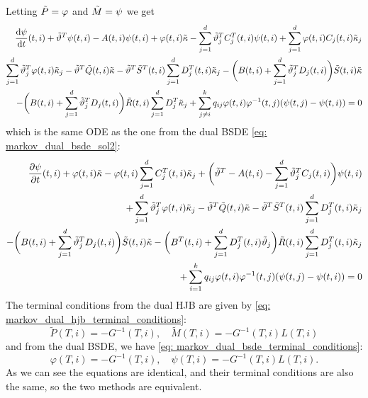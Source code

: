 Letting $\Tilde{P} = \varphi$ and $\Tilde{M} = \psi$ we get
\begin{align*}
    \frac{\mathop{}\!\mathrm{d} \psi}{\mathop{}\!\mathrm{d} t}(t,i) + \Tilde{\vartheta}^T \psi(t,i) - A(t,i) \psi(t,i) + \varphi(t,i) \Tilde{\kappa} - \sum_{j=1}^d \Tilde{\vartheta}_j^T C_j^T(t,i) \psi(t,i) + \sum_{j=1}^d \varphi(t,i) C_j(t,i) \Tilde{\kappa}_j\\
    \sum_{j=1}^d \Tilde{\vartheta}_j^T \varphi(t,i) \Tilde{\kappa}_j - \tilde{\vartheta}^T \Tilde{Q}(t,i) \Tilde{\kappa} - \Tilde{\vartheta}^T \Tilde{S}^T(t,i) \sum_{j=1}^d D_j^T(t,i) \Tilde{\kappa}_j - \bigg(B(t,i) + \sum_{j=1}^d \Tilde{\vartheta}_j^T D_j(t,i)\bigg)\Tilde{S}(t,i) \Tilde{\kappa}\\
    - \bigg( B(t,i) + \sum_{j=1}^d \Tilde{\vartheta}_j^T D_j(t,i) \bigg) \Tilde{R}(t,i) \sum_{j=1}^d D_j^T \Tilde{\kappa}_j +\sum_{j\ne i}^k q_{ij} \varphi(t,i) \varphi^{-1}(t,j) (\psi(t,j) - \psi(t,i)) = 0 
\end{align*}
which is the same ODE as the one from the dual BSDE \eqref{eq: markov_dual_bsde_sol2}: 
\begin{align*}
    \frac{\partial \psi}{\partial t}(t, i) + \varphi(t,i) \Tilde{\kappa} - \varphi(t,i) \sum_{j=1}^d C_j^T(t,i) \Tilde{\kappa}_j + \bigg( \Tilde{\vartheta}^T - A(t,i) - \sum_{j=1}^d \Tilde{\vartheta}^T_j C_j(t,i) \bigg) \psi(t,i)\\
    + \sum_{j=1}^d \Tilde{\vartheta}_j^T \varphi(t,i) \Tilde{\kappa}_j - \Tilde{\vartheta}^T \Tilde{Q}(t,i) \Tilde{\kappa} - \Tilde{\vartheta}^T \Tilde{S}^T(t,i) \sum_{j=1}^d D_j^T(t,i) \Tilde{\kappa}_j\\
    - \bigg( B(t,i) + \sum_{j=1}^d \Tilde{\vartheta}_j^T D_j(t,i) \bigg) \Tilde{S}(t,i) \Tilde{\kappa}
    - \bigg( B^T(t,i) + \sum_{j=1}^d D_j^T(t,i) \Tilde{\vartheta}_j\bigg) \Tilde{R}(t,i) \sum_{j=1}^d D_j^T(t,i) \Tilde{\kappa}_j\\
    + \sum_{i=1}^k q_{ij} \varphi(t,i) \varphi^{-1}(t,j) (\psi(t,j) - \psi(t,i)) = 0
\end{align*}
The terminal conditions from the dual HJB are given by \eqref{eq: markov_dual_hjb_terminal_conditions}:
\begin{equation*}
    \tilde{P}(T,i) = -G^{-1}(T,i), \quad  \tilde{M}(T,i) = - G^{-1}(T,i)L(T,i)
\end{equation*}
and from the dual BSDE, we have \eqref{eq: markov_dual_bsde_terminal_conditions}:
\begin{equation*}
    \varphi(T, i) = - G^{-1}(T, i), \quad \psi(T, i) = - G^{-1}(T,i) L(T, i). 
\end{equation*}
As we can see the equations are identical, and their terminal conditions are also the same, so
the two methods are equivalent.

